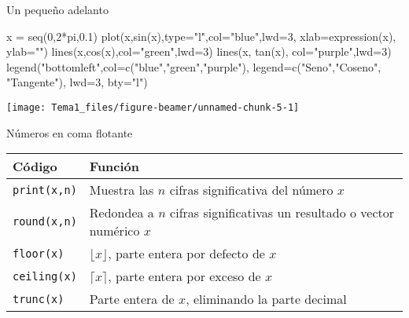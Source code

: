 \documentclass[
  ignorenonframetext,
]{beamer}
\newenvironment{Shaded}{\begin{snugshade}}{\end{snugshade}}
\newcommand{\AttributeTok}[1]{\textcolor[rgb]{0.77,0.63,0.00}{#1}}
\newcommand{\DecValTok}[1]{\textcolor[rgb]{0.00,0.00,0.81}{#1}}
\newcommand{\FloatTok}[1]{\textcolor[rgb]{0.00,0.00,0.81}{#1}}
\newcommand{\FunctionTok}[1]{\textcolor[rgb]{0.00,0.00,0.00}{#1}}
\newcommand{\NormalTok}[1]{#1}
\newcommand{\OtherTok}[1]{\textcolor[rgb]{0.56,0.35,0.01}{#1}}
\newcommand{\SpecialCharTok}[1]{\textcolor[rgb]{0.00,0.00,0.00}{#1}}
\newcommand{\StringTok}[1]{\textcolor[rgb]{0.31,0.60,0.02}{#1}}
\begin{document}
\begin{frame}[fragile]{Un pequeño adelanto}
\protect\hypertarget{un-pequeuxf1o-adelanto}{}
\begin{Shaded}
\begin{Highlighting}[]
\NormalTok{x }\OtherTok{=} \FunctionTok{seq}\NormalTok{(}\DecValTok{0}\NormalTok{,}\DecValTok{2}\SpecialCharTok{*}\NormalTok{pi,}\FloatTok{0.1}\NormalTok{)}
\FunctionTok{plot}\NormalTok{(x,}\FunctionTok{sin}\NormalTok{(x),}\AttributeTok{type=}\StringTok{"l"}\NormalTok{,}\AttributeTok{col=}\StringTok{"blue"}\NormalTok{,}\AttributeTok{lwd=}\DecValTok{3}\NormalTok{, }\AttributeTok{xlab=}\FunctionTok{expression}\NormalTok{(x), }\AttributeTok{ylab=}\StringTok{""}\NormalTok{)}
\FunctionTok{lines}\NormalTok{(x,}\FunctionTok{cos}\NormalTok{(x),}\AttributeTok{col=}\StringTok{"green"}\NormalTok{,}\AttributeTok{lwd=}\DecValTok{3}\NormalTok{)}
\FunctionTok{lines}\NormalTok{(x, }\FunctionTok{tan}\NormalTok{(x), }\AttributeTok{col=}\StringTok{"purple"}\NormalTok{,}\AttributeTok{lwd=}\DecValTok{3}\NormalTok{)}
\FunctionTok{legend}\NormalTok{(}\StringTok{"bottomleft"}\NormalTok{,}\AttributeTok{col=}\FunctionTok{c}\NormalTok{(}\StringTok{"blue"}\NormalTok{,}\StringTok{"green"}\NormalTok{,}\StringTok{"purple"}\NormalTok{),}
     \AttributeTok{legend=}\FunctionTok{c}\NormalTok{(}\StringTok{"Seno"}\NormalTok{,}\StringTok{"Coseno"}\NormalTok{, }\StringTok{"Tangente"}\NormalTok{), }\AttributeTok{lwd=}\DecValTok{3}\NormalTok{, }\AttributeTok{bty=}\StringTok{"l"}\NormalTok{)}
\end{Highlighting}
\end{Shaded}

\begin{center}\texttt{[image: Tema1\_files/figure-beamer/unnamed-chunk-5-1]} \end{center}
\end{frame}

\begin{frame}[fragile]{Números en coma flotante}
\protect\hypertarget{nuxfameros-en-coma-flotante}{}
\begin{longtable}[]{@{}
  >{\raggedright\arraybackslash}p{}
  >{\raggedright\arraybackslash}p{}@{}}
\toprule
Código & Función \\
\midrule
\endhead
\texttt{print(x,n)} & Muestra las \(n\) cifras significativa del número
\(x\) \\
\texttt{round(x,n)} & Redondea a \(n\) cifras significativas un
resultado o vector numérico \(x\) \\
\texttt{floor(x)} & \(\lfloor x\rfloor\), parte entera por defecto de
\(x\) \\
\texttt{ceiling(x)} & \(\lceil x\rceil\), parte entera por exceso de
\(x\) \\
\texttt{trunc(x)} & Parte entera de \(x\), eliminando la parte
decimal \\
\bottomrule
\end{longtable}
\end{frame}
\end{document}
